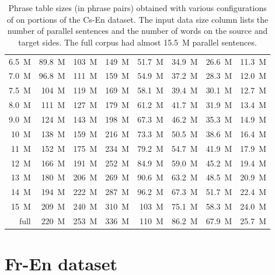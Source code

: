 \begin{table}[!htb]
\begin{tabular}{ | r  r  r | r  r  r  r  r | }
6.5~M & 89.8~M & 103~M & 149~M & 51.7~M & 34.9~M & 26.6~M & 11.3~M \\
7.0~M & 96.8~M & 111~M & 159~M & 54.9~M & 37.2~M & 28.3~M & 12.0~M \\
7.5~M & 104~M & 119~M & 169~M & 58.1~M & 39.4~M & 30.1~M & 12.7~M \\
8.0~M & 111~M & 127~M & 179~M & 61.2~M & 41.7~M & 31.9~M & 13.4~M \\
9.0~M & 124~M & 143~M & 198~M & 67.3~M & 46.2~M & 35.3~M & 14.9~M \\
10~M & 138~M & 159~M & 216~M & 73.3~M & 50.5~M & 38.6~M & 16.4~M \\
11~M & 152~M & 175~M & 234~M & 79.2~M & 54.7~M & 41.9~M & 17.9~M \\
12~M & 166~M & 191~M & 252~M & 84.9~M & 59.0~M & 45.2~M & 19.4~M \\
13~M & 180~M & 206~M & 269~M & 90.6~M & 63.2~M & 48.5~M & 20.9~M \\
14~M & 194~M & 222~M & 287~M & 96.2~M & 67.3~M & 51.7~M & 22.4~M \\
15~M & 209~M & 240~M & 310~M & 103~M & 75.1~M & 58.3~M & 24.0~M \\
full & 220~M & 253~M & 336~M & 110~M & 86.2~M & 67.9~M & 25.7~M \\
\hline
\end{tabular}
\caption{\label{cs-en-output-size-benchmarking}
Phrase table sizes (in phrase pairs) obtained with various configurations of \eppex{} on portions of the Cs-En dataset.
The input data size column lists the number of parallel sentences and the number of words on the source and target sides.
The full corpus had almost 15.5~M parallel sentences.}
\end{table}

\openright
\section{Fr-En dataset}

